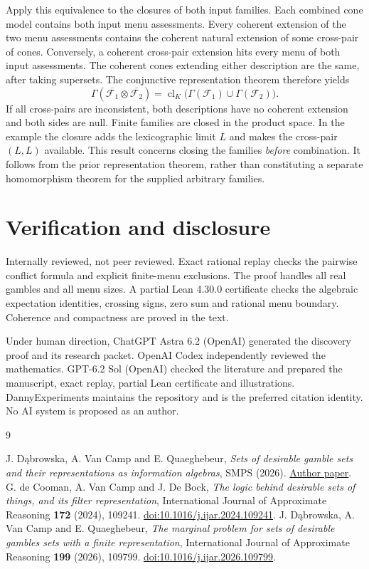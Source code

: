 \documentclass[11pt,a4paper]{amsart}
\begin{document}
Apply this equivalence to the closures of both input families.
Each combined cone model contains both input menu assessments.
Every coherent extension of the two menu assessments contains
the coherent natural extension of some cross-pair of cones.
Conversely, a coherent cross-pair extension hits every menu of
both input assessments. The coherent cones extending either
description are the same, after taking supersets. The conjunctive
representation theorem therefore yields
\[
 \Gamma(\overline{\mathcal F_1}\otimes\overline{\mathcal F_2})
  =\operatorname{cl}_K\bigl(\Gamma(\mathcal F_1)\cup
                            \Gamma(\mathcal F_2)\bigr).
\]
If all cross-pairs are inconsistent, both descriptions have no
coherent extension and both sides are null.
Finite families are closed in the product space.
In the example the closure adds the lexicographic limit \(L\)
and makes the cross-pair \((L,L)\) available.
This result concerns closing the families \emph{before}
combination. It follows from the prior representation theorem,
rather than constituting a separate homomorphism theorem for
the supplied arbitrary families.

\section{Verification and disclosure}

Internally reviewed, not peer reviewed. Exact rational replay
checks the pairwise conflict formula and explicit finite-menu
exclusions. The proof handles all real gambles and all menu
sizes. A partial Lean 4.30.0 certificate checks the algebraic
expectation identities, crossing signs, zero sum and rational
menu boundary. Coherence and compactness are proved in the text.

Under human direction, ChatGPT Astra 6.2 (OpenAI) generated the
discovery proof and its research packet. OpenAI Codex independently
reviewed the mathematics. GPT-6.2 Sol (OpenAI) checked the
literature and prepared the manuscript, exact replay, partial Lean certificate and
illustrations. DannyExperiments maintains the repository and
is the preferred citation identity. No AI system is proposed
as an author.

\begin{thebibliography}{9}
\raggedright
{}
J. D\k{a}browska, A. Van Camp and E. Quaeghebeur,
\emph{Sets of desirable gamble sets and their representations as
information algebras}, SMPS (2026).
\href{https://arthurvancamp.github.io/proceeding/smps2026/JD-SMPS2026-paper.pdf}{Author paper}.
G. de Cooman, A. Van Camp and J. De Bock,
\emph{The logic behind desirable sets of things, and its
filter representation}, International Journal of Approximate
Reasoning \textbf{172} (2024), 109241.
\href{https://doi.org/10.1016/j.ijar.2024.109241}{doi:10.1016/j.ijar.2024.109241}.
J. D\k{a}browska, A. Van Camp and E. Quaeghebeur,
\emph{The marginal problem for sets of desirable gambles sets
with a finite representation}, International Journal of
Approximate Reasoning \textbf{199} (2026), 109799.
\href{https://doi.org/10.1016/j.ijar.2026.109799}{doi:10.1016/j.ijar.2026.109799}.
\end{thebibliography}
\end{document}
